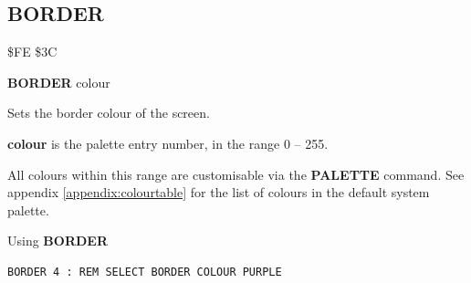 
\newpage
\subsection{BORDER}
\begin{description}[leftmargin=2cm,style=nextline]
\item [Token:]   \$FE \$3C

\item [Format:]  {\bf BORDER} colour

\item [Usage:]   Sets the border colour of the screen.

                 {\bf colour} is the palette entry number, in the range 0 -- 255.

                 All colours within this range are customisable via the {\bf PALETTE} command. See appendix \vref{appendix:colourtable} for the list of colours in the default system palette.

\item [Example:] Using {\bf BORDER}

\begin{tcolorbox}[colback=black,coltext=white]
\verbatimfont{\codefont}
\begin{verbatim}
BORDER 4 : REM SELECT BORDER COLOUR PURPLE
\end{verbatim}
\end{tcolorbox}
\end{description}


\newpage
